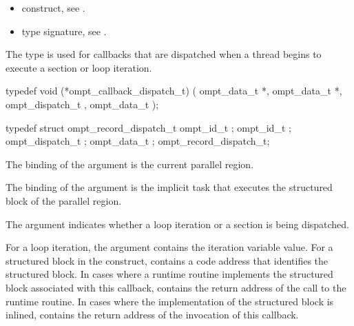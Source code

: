 \crossreferences
\begin{itemize}
\item {} construct, see .

\item {} type signature, see .
\end{itemize}



\label{sec:ompt_callback_dispatch_t}

\summary
The  type is used for callbacks that are
dispatched when a thread begins to execute a section or loop iteration.

\format
\begin{ccppspecific}
\begin{omptCallback}
typedef void (*ompt_callback_dispatch_t) (
  ompt_data_t *,
  ompt_data_t *,
  ompt_dispatch_t ,
  ompt_data_t  
);
\end{omptCallback}
\end{ccppspecific}

\record
\begin{ccppspecific}
\begin{omptRecord}
typedef struct ompt_record_dispatch_t {
  ompt_id_t ;
  ompt_id_t ;
  ompt_dispatch_t ;
  ompt_data_t ; 
} ompt_record_dispatch_t;
\end{omptRecord}
\end{ccppspecific}

\argdesc
The binding of the  argument is the current parallel region.

The binding of the  argument is the implicit task that executes
the structured block of the parallel region.

The  argument indicates whether a loop iteration or a section is being 
dispatched.

For a loop iteration, the  argument contains the iteration 
variable value. For a structured block in the  construct, 
 contains a code address that identifies the structured block.  
In cases where a runtime routine implements the structured block associated with 
this callback,  contains the return address of the call to the 
runtime routine. In cases where the implementation of the structured block is 
inlined,  contains the return address of the invocation of 
this callback.

